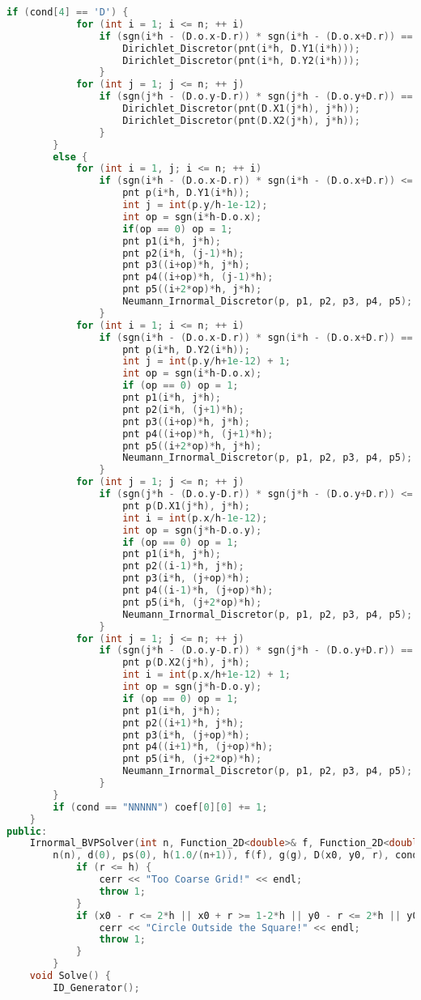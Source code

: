 \documentclass{ctexart}
\begin{document}
\begin{lstlisting}[language={c++}]
		if (cond[4] == 'D') {
			for (int i = 1; i <= n; ++ i) 
				if (sgn(i*h - (D.o.x-D.r)) * sgn(i*h - (D.o.x+D.r)) == -1) {
					Dirichlet_Discretor(pnt(i*h, D.Y1(i*h)));
					Dirichlet_Discretor(pnt(i*h, D.Y2(i*h)));
				}
			for (int j = 1; j <= n; ++ j)
				if (sgn(j*h - (D.o.y-D.r)) * sgn(j*h - (D.o.y+D.r)) == -1) {
					Dirichlet_Discretor(pnt(D.X1(j*h), j*h));
					Dirichlet_Discretor(pnt(D.X2(j*h), j*h));
				}			
		}
		else {
			for (int i = 1, j; i <= n; ++ i)
				if (sgn(i*h - (D.o.x-D.r)) * sgn(i*h - (D.o.x+D.r)) <= 0) {
					pnt p(i*h, D.Y1(i*h));
					int j = int(p.y/h-1e-12);
					int op = sgn(i*h-D.o.x);
					if(op == 0) op = 1;
					pnt p1(i*h, j*h);
					pnt p2(i*h, (j-1)*h);
					pnt p3((i+op)*h, j*h);
					pnt p4((i+op)*h, (j-1)*h);
					pnt p5((i+2*op)*h, j*h);
					Neumann_Irnormal_Discretor(p, p1, p2, p3, p4, p5);
				}
			for (int i = 1; i <= n; ++ i)
				if (sgn(i*h - (D.o.x-D.r)) * sgn(i*h - (D.o.x+D.r)) == -1) {
					pnt p(i*h, D.Y2(i*h));
					int j = int(p.y/h+1e-12) + 1;
					int op = sgn(i*h-D.o.x);
					if (op == 0) op = 1;
					pnt p1(i*h, j*h);
					pnt p2(i*h, (j+1)*h);
					pnt p3((i+op)*h, j*h);
					pnt p4((i+op)*h, (j+1)*h);
					pnt p5((i+2*op)*h, j*h);
					Neumann_Irnormal_Discretor(p, p1, p2, p3, p4, p5);
				}
			for (int j = 1; j <= n; ++ j)
				if (sgn(j*h - (D.o.y-D.r)) * sgn(j*h - (D.o.y+D.r)) <= 0) {
					pnt p(D.X1(j*h), j*h);
					int i = int(p.x/h-1e-12);
					int op = sgn(j*h-D.o.y);
					if (op == 0) op = 1;
					pnt p1(i*h, j*h);
					pnt p2((i-1)*h, j*h);
					pnt p3(i*h, (j+op)*h);
					pnt p4((i-1)*h, (j+op)*h);
					pnt p5(i*h, (j+2*op)*h);
					Neumann_Irnormal_Discretor(p, p1, p2, p3, p4, p5);
				}
			for (int j = 1; j <= n; ++ j)
				if (sgn(j*h - (D.o.y-D.r)) * sgn(j*h - (D.o.y+D.r)) == -1) {
					pnt p(D.X2(j*h), j*h);
					int i = int(p.x/h+1e-12) + 1;
					int op = sgn(j*h-D.o.y);
					if (op == 0) op = 1;
					pnt p1(i*h, j*h);
					pnt p2((i+1)*h, j*h);
					pnt p3(i*h, (j+op)*h);
					pnt p4((i+1)*h, (j+op)*h);
					pnt p5(i*h, (j+2*op)*h);
					Neumann_Irnormal_Discretor(p, p1, p2, p3, p4, p5);
				}
		}
		if (cond == "NNNNN") coef[0][0] += 1;
	}
public:
	Irnormal_BVPSolver(int n, Function_2D<double>& f, Function_2D<double>& g, double x0, double y0, double r, const string& s) :
		n(n), d(0), ps(0), h(1.0/(n+1)), f(f), g(g), D(x0, y0, r), cond(s) {
			if (r <= h) {
				cerr << "Too Coarse Grid!" << endl;
				throw 1;
			}
			if (x0 - r <= 2*h || x0 + r >= 1-2*h || y0 - r <= 2*h || y0 + r >= 1-2*h) {
				cerr << "Circle Outside the Square!" << endl;
				throw 1;
			}
		}
	void Solve() {
		ID_Generator();

\end{lstlisting}
\end{document}
